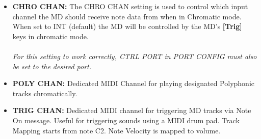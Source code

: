 \begin{itemize}
\item{\textbf{CHRO CHAN:} The CHRO CHAN setting is used to control which input channel the MD should receive note data from when in Chromatic mode. When set to INT (default) the MD will be controlled by the MD's \textbf{[Trig]} keys in chromatic mode. \\\\\textit{For this setting to work correctly, CTRL PORT in PORT CONFIG must also be set to the desired port.}}

\item{\textbf{POLY CHAN:} Dedicated MIDI Channel for playing designated Polyphonic tracks chromatically.}
\item{\textbf{TRIG CHAN:} Dedicated MIDI channel for triggering MD tracks via Note On message. Useful for triggering sounds using a MIDI drum pad. Track Mapping starts from note C2. Note Velocity is mapped to volume.}
\end{itemize}